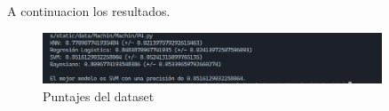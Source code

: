 \documentclass[12pt]{article}
\begin{document}
A continuacion los resultados.
\vspace{1cm}\vspace{1cm}
\begin{figure}[h] %
    \centering
    \includegraphics[width=0.9\textwidth]{1.jpg} %
    \caption{Puntajes del dataset} %
    \label{fig:1} %
\end{figure}
\vspace{1cm}\vspace{1cm}



\clearpage
\end{document}
